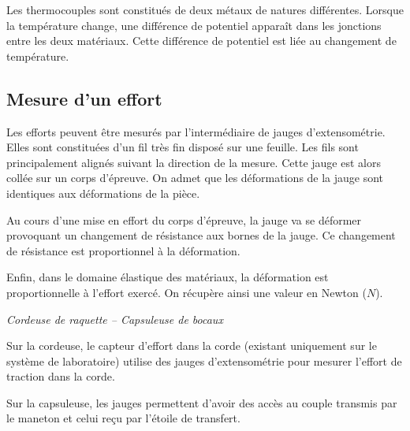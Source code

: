\documentclass[10pt]{article}
\begin{document}
Les thermocouples sont constitués de deux métaux de natures différentes. Lorsque la température change, une différence de potentiel apparaît dans les jonctions entre les deux matériaux. Cette différence de potentiel est liée au changement de température.

\subsection{Mesure d'un effort}


\begin{minipage}[c]{.75\linewidth}
Les efforts peuvent être mesurés par l'intermédiaire de jauges d'extensométrie. Elles sont constituées d'un fil très fin disposé sur une feuille. Les fils sont principalement alignés suivant la direction de la mesure. Cette jauge est alors collée sur un corps d'épreuve. On admet que les déformations de la jauge sont identiques aux déformations de la pièce. 

Au cours d'une mise en effort du corps d'épreuve, la jauge va se déformer provoquant un changement de résistance aux bornes de la jauge. Ce changement de résistance est proportionnel à la déformation. 

Enfin, dans le domaine élastique des matériaux, la déformation est proportionnelle à l'effort exercé. On récupère ainsi une valeur en Newton ($N$).


\begin{exemple}
\textit{Cordeuse de raquette -- Capsuleuse de bocaux}

Sur la cordeuse, le capteur d'effort dans la corde (existant uniquement sur le système de laboratoire) utilise des jauges d'extensométrie pour mesurer l'effort de traction dans la corde.

Sur la capsuleuse, les jauges permettent d'avoir des accès au couple transmis par le maneton et celui reçu par l'étoile de transfert.
\end{exemple}

\end{minipage}\hfill
\end{document}
